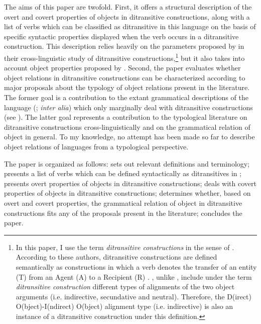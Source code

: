 \documentclass[output=paper]{langsci/langscibook}
\begin{document}
The aims of this paper are twofold. First, it offers a structural description of the overt and covert properties of objects in  ditransitive constructions, along with a list of verbs which can be classified as ditransitive in this language on the basis of specific syntactic properties displayed when the verb occurs in a ditransitive construction. This description relies heavily on the parameters proposed by \citet{malchukovetal2010} in their cross-linguistic study of ditransitive constructions,\footnote{In this paper, I use the term \textit{ditransitive constructions} in the sense of \citet{malchukovetal2010}. According to these authors, ditransitive constructions are defined semantically as constructions in which a verb denotes the transfer of an entity (T) from an Agent (A) to a Recipient (R) \citep[1]{malchukovetal2010}. \citet{malchukovetal2010}, unlike \citet{goldberg1995}, include under the term \textit{ditransitive construction} different types of alignments of the two object arguments (i.e. indirective, secundative and neutral). Therefore, the D(irect) O(bject)-I(ndirect) O(bject) alignment type (i.e. indirective) is also an instance of a ditransitive construction under this definition.} but it also takes into account object properties proposed by \citet{hymanduranti1982}. Second, the paper evaluates whether object relations in  ditransitive constructions can be characterized according to major proposals about the typology of object relations present in the literature. The former goal is a contribution to the extant grammatical descriptions of the language (\citealt{alexandre1953,canu1974,peterson1971,kouraogo1976,kabore1985}; \textit{inter alia}) which only marginally deal with ditransitive constructions (see \citealt{canu1974,kabore1985}). The latter goal represents a contribution to the typological literature on ditransitive constructions cross-linguistically and on the grammatical relation of object in general. To my knowledge, no attempt has been made so far to describe object relations of  languages from a typological perspective.  

The paper is organized as follows:  sets out relevant definitions and terminology;  presents a list of verbs which can be defined syntactically as ditransitives in ;  presents overt properties of objects in  ditransitive constructions;  deals with covert properties of objects in  ditransitive constructions;  determines whether, based on overt and covert properties, the grammatical relation of object in  ditransitive constructions fits any of the proposals present in the literature;  concludes the paper.    
\end{document}
